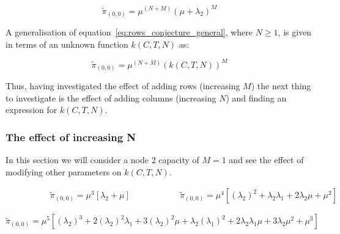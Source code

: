 \begin{equation}\label{eq:rows_conjecture_general}
    \tilde{\pi}_{(0,0)} = \mu^{(N+M)} (\mu + \lambda_2)^M
\end{equation}

A generalisation of equation~\eqref{eq:rows_conjecture_general}, where \(N \geq
1\), is given in terms of an unknown function \(k(C,T,N)\) as:

\begin{equation}
    \tilde{\pi}_{(0,0)} = \mu^{(N+M)} (k(C,T,N))^M
\end{equation}

Thus, having investigated the effect of adding rows (increasing \(M\)) the
next thing to investigate is the effect of adding columns (increasing \(N\))
and finding an expression for \(k(C,T,N)\).

\subsubsection{The effect of increasing N}
In this section we will consider a node 2 capacity of \(M=1\) and see the
effect
of modifying other parameters on \(k(C, T, N)\).

\begin{multicols}{2}
    \begin{figure}[H]
        \centering
        \scalebox{0.8}{
            }
    \end{figure}
    \columnbreak
    \begin{figure}[H]
        \centering
        \scalebox{0.7}{
            }
    \end{figure}
\end{multicols}
\vspace{-0.5cm}
\begin{alignat}{2} \label{eq:00_rate_1131}
    \hspace{4em} & \tilde{\pi}_{(0,0)} = \mu^3[\lambda_2 + \mu] \hspace{5em} &
    \tilde{\pi}_{(0,0)} = \mu^4[(\lambda_2)^2 + \lambda_2 \lambda_1 + 2\lambda_2
    \mu + \mu^2]
\end{alignat}


\begin{figure}[H]
    \centering
    \scalebox{0.8}{
        }
\end{figure}
\begin{equation}\label{eq:00_rate_1141}
    \tilde{\pi}_{(0,0)} = \mu^5[(\lambda_2)^3 + 2(\lambda_2)^2 \lambda_1 +
    3(\lambda_2)^2 \mu + \lambda_2 (\lambda_1)^2 + 2\lambda_2 \lambda_1 \mu +
    3\lambda_2 \mu^2 + \mu^3]
\end{equation}

